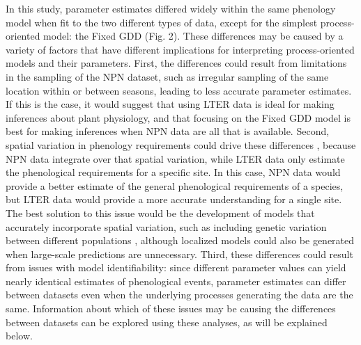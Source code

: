 \documentclass[fleqn,12pt,lineno]{article}
\begin{document}
In this study, parameter estimates differed widely within the same phenology model when fit to the two different types of data, except for the simplest process-oriented model: the Fixed GDD (Fig. 2). These differences may be caused by a variety of factors that have different implications for interpreting process-oriented models and their parameters. First, the differences could result from limitations in the sampling of the NPN dataset, such as irregular sampling of the same location within or between seasons, leading to less accurate parameter estimates. If this is the case, it would suggest that using LTER data is ideal for making inferences about plant physiology, and that focusing on the Fixed GDD model is best for making inferences when NPN data are all that is available. Second, spatial variation in phenology requirements could drive these differences \citep{diez2012, zhang2017}, because NPN data integrate over that spatial variation, while LTER data only estimate the phenological requirements for a specific site. In this case, NPN data would provide a better estimate of the general phenological requirements of a species, but LTER data would provide a more accurate understanding for a single site. The best solution to this issue would be the development of models that accurately incorporate spatial variation, such as including genetic variation between different populations \citep{chuine2017}, although localized models could also be generated when large-scale predictions are unnecessary. Third, these differences could result from issues with model identifiability: since different parameter values can yield nearly identical estimates of phenological events, parameter estimates can differ between datasets even when the underlying processes generating the data are the same. Information about which of these issues may be causing the differences between datasets can be explored using these analyses, as will be explained below.
\end{document}
